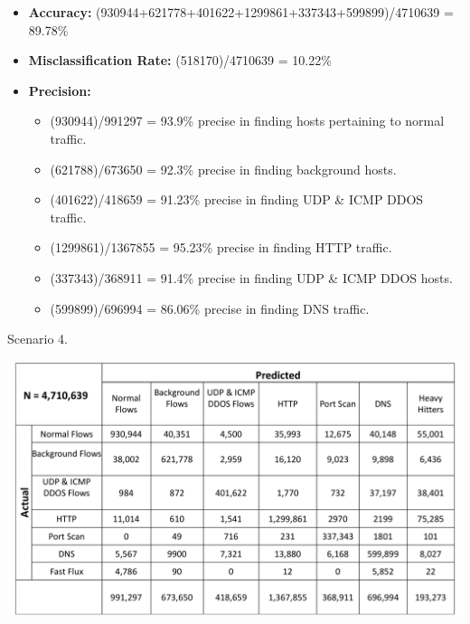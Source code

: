 \begin{itemize}
	\item \textbf{Accuracy:}  (930944+621778+401622+1299861+337343+599899)/4710639 = 89.78\%
	
	\item \textbf{Misclassification Rate:} (518170)/4710639 = 10.22\%
	
	\item \textbf{Precision:} 
	\begin{itemize}			
		
		\item (930944)/991297 = 93.9\% precise in finding hosts pertaining to normal traffic.
		
		\item (621788)/673650 = 92.3\% precise in finding background hosts.
		
		\item (401622)/418659 = 91.23\% precise in finding UDP \& ICMP DDOS traffic.
		
		\item (1299861)/1367855 = 95.23\% precise in finding HTTP traffic.
		
		\item (337343)/368911 = 91.4\% precise in finding UDP \& ICMP DDOS hosts.
		
		\item (599899)/696994 = 86.06\% precise in finding DNS traffic.
	\end{itemize}
	
\end{itemize}

\begin{table}[b]
	\caption{Scenario 4.}%
	\centerline{\includegraphics[scale = 0.45]{scenario4.pdf}}	
\end{table}

